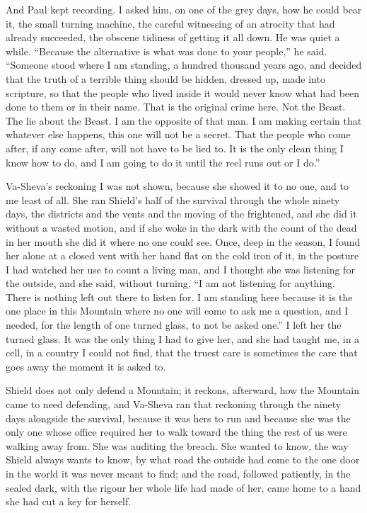 And Paul kept recording. I asked him, on one of the grey days, how he could bear it, the small turning machine, the careful witnessing of an atrocity that had already succeeded, the obscene tidiness of getting it all down. He was quiet a while. ``Because the alternative is what was done to your people,'' he said. ``Someone stood where I am standing, a hundred thousand years ago, and decided that the truth of a terrible thing should be hidden, dressed up, made into scripture, so that the people who lived inside it would never know what had been done to them or in their name. That is the original crime here. Not the Beast. The lie about the Beast. I am the opposite of that man. I am making certain that whatever else happens, this one will not be a secret. That the people who come after, if any come after, will not have to be lied to. It is the only clean thing I know how to do, and I am going to do it until the reel runs out or I do.''\par

Va-Sheva's reckoning I was not shown, because she showed it to no one, and to me least of all. She ran Shield's half of the survival through the whole ninety days, the districts and the vents and the moving of the frightened, and she did it without a wasted motion, and if she woke in the dark with the count of the dead in her mouth she did it where no one could see. Once, deep in the season, I found her alone at a closed vent with her hand flat on the cold iron of it, in the posture I had watched her use to count a living man, and I thought she was listening for the outside, and she said, without turning, ``I am not listening for anything. There is nothing left out there to listen for. I am standing here because it is the one place in this Mountain where no one will come to ask me a question, and I needed, for the length of one turned glass, to not be asked one.'' I left her the turned glass. It was the only thing I had to give her, and she had taught me, in a cell, in a country I could not find, that the truest care is sometimes the care that goes away the moment it is asked to.\par

\ornament

Shield does not only defend a Mountain; it reckons, afterward, how the Mountain came to need defending, and Va-Sheva ran that reckoning through the ninety days alongside the survival, because it was hers to run and because she was the only one whose office required her to walk toward the thing the rest of us were walking away from. She was auditing the breach. She wanted to know, the way Shield always wants to know, by what road the outside had come to the one door in the world it was never meant to find; and the road, followed patiently, in the sealed dark, with the rigour her whole life had made of her, came home to a hand she had cut a key for herself.\par

